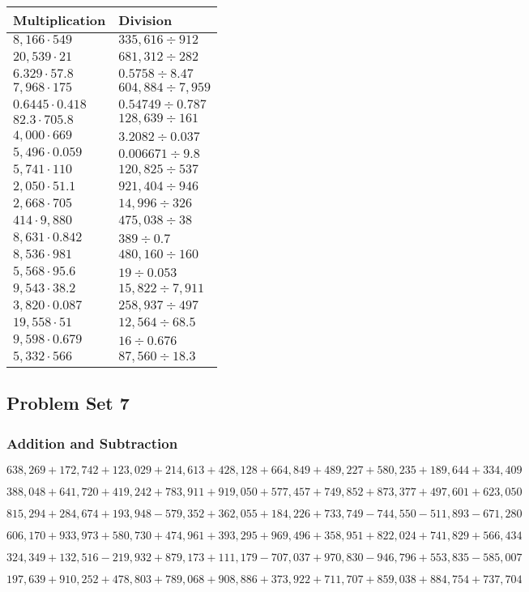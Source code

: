 \begin{longtable}[]{@{}ll@{}}
\toprule
Multiplication & Division\tabularnewline
\midrule
\endhead
\(8,166\cdot549\) & \(335,616÷912\)\tabularnewline
\(20,539\cdot21\) & \(681,312÷282\)\tabularnewline
\(6.329\cdot57.8\) & \(0.5758 ÷8.47\)\tabularnewline
\(7,968\cdot175\) & \(604,884÷7,959\)\tabularnewline
\(0.6445\cdot0.418\) & \(0.54749÷0.787\)\tabularnewline
\(82.3\cdot705.8\) & \(128,639÷161\)\tabularnewline
\(4,000\cdot669\) & \(3.2082÷0.037\)\tabularnewline
\(5,496\cdot0.059\) & \(0.006671÷9.8\)\tabularnewline
\(5,741\cdot110\) & \(120,825÷537\)\tabularnewline
\(2,050\cdot51.1\) & \(921,404÷946\)\tabularnewline
\(2,668\cdot705\) & \(14,996÷326\)\tabularnewline
\(414\cdot9,880\) & \(475,038÷38\)\tabularnewline
\(8,631\cdot0.842\) & \(389÷0.7\)\tabularnewline
\(8,536\cdot981\) & \(480,160÷160\)\tabularnewline
\(5,568\cdot95.6\) & \(19÷0.053\)\tabularnewline
\(9,543\cdot38.2\) & \(15,822÷7,911\)\tabularnewline
\(3,820\cdot0.087\) & \(258,937÷497\)\tabularnewline
\(19,558\cdot51\) & \(12,564÷68.5\)\tabularnewline
\(9,598\cdot0.679\) & \(16÷0.676\)\tabularnewline
\(5,332\cdot566\) & \(87,560÷18.3\)\tabularnewline
\bottomrule
\end{longtable}

\hypertarget{problem-set-7-5}{%
\subsection{Problem Set 7}\label{problem-set-7-5}}

\hypertarget{addition-and-subtraction-312}{%
\subsubsection{Addition and
Subtraction}\label{addition-and-subtraction-312}}

\(638,269+172,742+123,029+214,613+428,128+664,849+489,227+580,235+189,644+ 334,409\)

\(388,048+641,720+419,242+783,911+919,050+577,457+749,852+873,377+497,601+623,050\)

\(815,294+284,674+193,948-579,352+362,055+184,226+733,749-744,550-511,893-671,280\)

\(606,170+933,973+580,730+474,961+393,295+969,496+358,951+822,024+741,829+566,434\)

\(324,349+132,516-219,932+879,173+111,179-707,037+970,830-946,796+553,835-585,007\)

\(197,639+910,252+478,803+789,068+908,886+373,922+711,707+859,038+884,754+737,704\)

